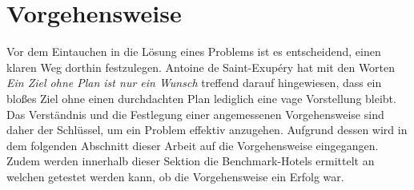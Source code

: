 \section{Vorgehensweise}
\label{sec:Vorgehensweise}
Vor dem Eintauchen in die Lösung eines Problems ist es entscheidend, einen klaren Weg dorthin festzulegen. Antoine de Saint-Exupéry hat mit den Worten \emph{Ein Ziel ohne Plan ist nur ein Wunsch} treffend darauf hingewiesen, dass ein bloßes Ziel ohne einen durchdachten Plan lediglich eine vage Vorstellung bleibt. Das Verständnis und die Festlegung einer angemessenen Vorgehensweise sind daher der Schlüssel, um ein Problem effektiv anzugehen. Aufgrund dessen wird in dem folgenden Abschnitt dieser Arbeit auf die Vorgehensweise eingegangen. Zudem werden innerhalb dieser Sektion die Benchmark-Hotels ermittelt an welchen getestet werden kann, ob die Vorgehensweise ein Erfolg war.  


